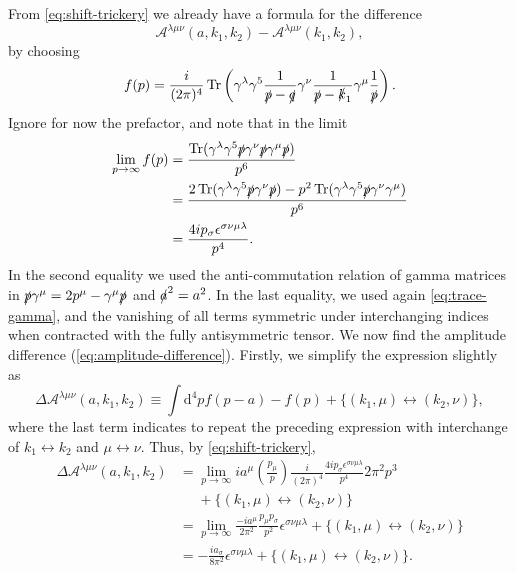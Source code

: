 From \cref{eq:shift-trickery} we already have a formula for the difference
\begin{equation}
  \label{eq:amplitude-difference}
  \mathcal{A}^{\lambda \mu \nu } (a, k_1, k_2) - \mathcal{A}^{\lambda \mu \nu }(k_1, k_2),
\end{equation}
by choosing
\[
  f(p) = \frac{i}{(2\pi)^{4}} \operatorname{Tr} \left( \gamma ^{\lambda }\gamma ^5 \frac{1}{\slashed{p} - \slashed{q}} \gamma ^{\nu } \frac{1}{\slashed{p} - \slashed{k}_{1}} \gamma ^{\mu } \frac{1}{\slashed{p} } \right). 
\]
Ignore for now the prefactor, and note that in the limit
\begin{equation}
  \begin{split}
    \lim_{p\to \infty } f(p) &=
    \frac{\operatorname{Tr}(\gamma ^{\lambda }\gamma ^5 \slashed{p} \gamma ^{\nu } \slashed{p}\gamma ^{\mu }\slashed{p})}{p^6}\\
    &= \frac{2 \operatorname{Tr}(\gamma ^{\lambda }\gamma ^5 \slashed{p}\gamma ^\nu \slashed{p}) - p^2\operatorname{Tr}(\gamma ^{\lambda }\gamma ^5 \slashed{p} \gamma ^{\nu }\gamma ^{\mu })}{p^6}\\
    &= \frac{{4i p_{\sigma }\epsilon ^{\sigma \nu \mu \lambda }}}{p^{4}}.
  \end{split}
\end{equation}
In the second equality we used the anti-commutation relation of gamma matrices in $\slashed{p} \gamma ^{\mu } = 2p^{\mu } - \gamma ^{\mu } \slashed{p}$ and $\slashed{a}^2 = a^2$.
In the last equality, we used again \cref{eq:trace-gamma}, and the vanishing of all terms symmetric under interchanging indices when contracted with the fully antisymmetric tensor.
We now find the amplitude difference (\ref{eq:amplitude-difference}).
Firstly, we simplify the  expression slightly as
\begin{equation}
  \Delta \mathcal{A}^{\lambda \mu \nu }(a, k_1, k_2) \equiv \int \mathrm{d}^4p f(p-a) - f(p) +  \{(k_1,\mu ) \leftrightarrow (k_2, \nu )\},
\end{equation}
where the last term indicates to repeat the preceding expression with interchange of $k_1 \leftrightarrow  k_2$ and $\mu \leftrightarrow \nu$.
Thus, by \cref{eq:shift-trickery},
\begin{equation}
  \label{eq:amplitude-difference-explicit}
  \begin{split}
  \Delta \mathcal{A}^{\lambda \mu \nu}(a, k_1, k_2) &=
    \lim_{p\to \infty } i  a^{\mu } \left( \frac{p_{\mu }}{p} \right)
  \frac{i}{(2\pi)^{4}} \frac{{4ip_{\sigma }\epsilon ^{\sigma \nu \mu \lambda }}}{p^{4}}
  2\pi^2p^3\\
  &\phantom{=}+ \{(k_1,\mu ) \leftrightarrow (k_2, \nu )\}\\
  &= \lim_{p\to \infty } \frac{{-ia^{\mu }}}{2\pi^2} \frac{{p_{\mu }p_{\sigma }}}{p^2} \epsilon ^{\sigma \nu \mu \lambda } +  \{(k_1,\mu ) \leftrightarrow (k_2, \nu )\}\\
  &= - \frac{ia_{\sigma }}{8 \pi^2}\epsilon ^{\sigma \nu \mu \lambda } +  \{(k_1,\mu ) \leftrightarrow (k_2, \nu )\}.
  \end{split}
\end{equation}

